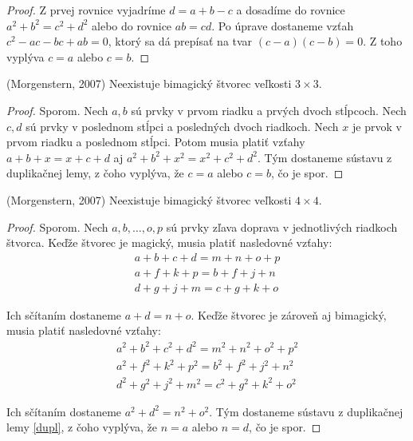 \begin{proof} Z prvej rovnice vyjadríme $d = a + b - c$ a dosadíme do rovnice $a^2 + b^2 = c^2 + d^2$ alebo do rovnice $ab = cd$. Po úprave dostaneme vzťah $c^2 - ac - bc + ab = 0$, ktorý sa dá prepísať na tvar $(c - a)(c - b) = 0$. Z toho vyplýva $c = a$ alebo $c = b$.
\end{proof} 

\begin{theorem} (Morgenstern, 2007) Neexistuje bimagický štvorec veľkosti $3 \times 3$.
\end{theorem}

\begin{proof} Sporom. Nech $a,b$ sú prvky v prvom riadku a prvých dvoch stĺpcoch. Nech $c,d$ sú prvky v poslednom stĺpci a posledných dvoch riadkoch. Nech $x$ je prvok v prvom riadku a poslednom stĺpci. Potom musia platiť vzťahy $a + b + x = x + c + d$ aj $a^2 + b^2 + x^2 = x^2 + c^2 + d^2$. Tým dostaneme sústavu z duplikačnej lemy, z čoho vyplýva, že $c = a$ alebo $c = b$, čo je spor.
\end{proof} 

\begin{theorem} (Morgenstern, 2007) Neexistuje bimagický štvorec veľkosti $4 \times 4$.
\end{theorem}

\begin{proof} Sporom. Nech $a, b, \dots , o, p$ sú prvky zľava doprava v jednotlivých riadkoch štvorca. Keďže štvorec je magický, musia platiť nasledovné vzťahy:
\begin{gather*}
a + b + c + d = m + n + o + p \\
a + f + k + p = b + f + j + n \\
d + g + j + m = c + g + k + o
\end{gather*}

Ich sčítaním dostaneme $a + d = n + o$. Keďže štvorec je zároveň aj bimagický, musia platiť nasledovné vzťahy:
\begin{gather*}
a^2 + b^2 + c^2 + d^2 = m^2 + n^2 + o^2 + p^2 \\
a^2 + f^2 + k^2 + p^2 = b^2 + f^2 + j^2 + n^2 \\
d^2 + g^2 + j^2 + m^2 = c^2 + g^2 + k^2 + o^2
\end{gather*}

Ich sčítaním dostaneme $a^2 + d^2 = n^2 + o^2$. Tým dostaneme sústavu z duplikačnej lemy \ref{dupl}, z čoho vyplýva, že $n = a$ alebo $n = d$, čo je spor.
\end{proof} 

